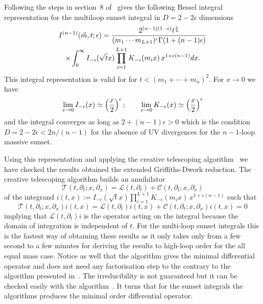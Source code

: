 \documentclass[a4paper,12pt]{article}
\numberwithin{equation}{section}
\numberwithin{figure}{section}
\begin{document}
Following the steps in section~8 of~\cite{Vanhove:2014wqa}
gives the following Bessel integral representation for the multiloop
sunset integral in  $D=2-2\epsilon$ dimensions
\begin{multline}
  I^{(n-1)}(\vec m,t;\epsilon)=
  {2^{(n-1) (1-\epsilon)} t^{\epsilon\over2} \over    (m_1\cdots m_{L+1})^{\epsilon}
  \Gamma(1+(n-1)\epsilon)}\cr\times\int_0^\infty I_{-\epsilon}(\sqrt{t} x)
  \prod_{i=1}^{L+1}K_{-\epsilon}(m_ix)\,  x^{1+\epsilon(n-1)}dx.
\end{multline}
This integral representation is valid for   for $t<(m_1+\cdots +m_{n})^2$.
%
For $x\to0$ we have
\begin{equation}
  \lim_{x\to0} I_{-\epsilon}(x)\simeq \left(x\over2\right)^{\epsilon};    \qquad
  \lim_{x\to0} K_{-\epsilon}(x)   \simeq \left(x\over2\right)^{\epsilon}
\end{equation}
and the integral converges as long as $2+(n-1)\epsilon>0$ which is the
condition $D=2-2\epsilon< 2n/(n-1)$ for the absence of UV divergences
for the $n-1$-loop massive sunset.

Using this representation and applying the creative telescoping
algorithm~\cite{Chyzak,Chyzak2,bostan2013creative,Koutchan} we have checked the results obtained the
extended Griffiths-Dwork reduction.
The creative telescoping algorithm builds an annihilator
\begin{equation}
  \mathscr{T}(t,\partial_t; x,\partial_x)= \mathscr{L}(t,\partial_t)+ \mathscr{C}(  t,\partial_t; x,\partial_x)
\end{equation}
of the integrand
$i(t,x):= I_{-\epsilon}(\sqrt{t} x)
  \prod_{i=1}^{L+1}K_{-\epsilon}(m_ix)\,  x^{1+\epsilon(n-1)}$
such that
\begin{equation}
      \mathscr{T}(t,\partial_t; x,\partial_x) i(t,x)=\mathscr{L}(t,\partial_t)i(t,x)+ \mathscr{C}(  t,\partial_t; x,\partial_x) i(t,x)=0
    \end{equation}
    implying that $\mathscr{L}(t,\partial_t)i$ is the operator acting
    on the integral because the domain of integration is independent
    of $t$.
For the multi-loop sunset
integrals this is the fastest way of obtaining these results as it
only takes only from a few second to a few minutes for deriving the
results to high-loop order for the all equal mass case. Notice as well
that the algorithm gives the minimal  differential operator and does
not need any factorisation step to the contrary to the algorithm
presented in~\cite{Pogel:2022vat}. The irreducibility is not guaranteed
but it can be checked easily with the algorithm~\cite{chyzak2022symbolic,goyer2021sage}. It
turns that for the sunset integrals the algorithms produces the
minimal order differential operator.
\end{document}
